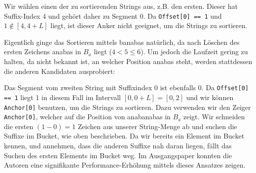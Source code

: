 Wir wählen einen der zu sortierenden Strings aus, z.B. den ersten.
Dieser hat Suffix-Index 4 und gehört daher zu Segment 0.
Da \texttt{Offset[0] == 1} und $1 \not \in [4, 4 + L]$ liegt, ist dieser Anker nicht geeignet, um die Strings zu sortieren.

Eigentlich ginge das Sortieren mittels \glqq banabas\grqq{} natürlich, da nach Löschen des ersten Zeichens \glqq anabas\grqq{} in $B_a$ liegt ($4 < 5 \leq 6$).
Um jedoch die Laufzeit gering zu halten, da nicht bekannt ist, an welcher Position \glqq anabas\grqq{} steht, werden stattdessen die anderen Kandidaten ausprobiert:

Das Segment vom zweiten String mit Suffixindex 0 ist ebenfalls 0.
Da \texttt{Offset[0] == 1} liegt 1 in diesem Fall im Intervall $[0, 0 + L] = [0, 2]$ und wir können \texttt{Anchor[0]} benutzen, um die Strings zu sortieren.
Dazu verwenden wir den Zeiger \texttt{Anchor[0]}, welcher auf die Position von \glqq anabanabas\grqq{} in $B_a$ zeigt.
Wir schneiden die ersten $(1 - 0) = 1$ Zeichen aus unserer String-Menge ab und suchen die Suffixe im Bucket, wie oben beschrieben.
Da wir bereits ein Element im Bucket kennen, und annehmen, dass die anderen Suffixe nah daran liegen, fällt das Suchen des ersten Elements im Bucket weg.
Im Ausgangspaper konnten die Autoren eine signifikante Performance-Erhöhung mittels dieses Ansatzes zeigen.

